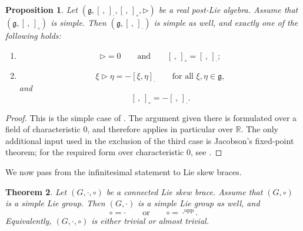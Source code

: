 \documentclass[reqno]{amsart}
\newtheorem{theorem}{Theorem}[section]
\newtheorem{proposition}[theorem]{Proposition}
\newcommand{\R}{\mathbb R}
\newcommand{\g}{\mathfrak{g}}
\begin{document}
\begin{proposition}\label{prop:PLA-simple-rigidity}
Let
$(\g,[\, ,\,]_{\cdot},[\, ,\,]_{\circ},\triangleright)$
be a real post-Lie algebra. Assume that
$(\g,[\, ,\,]_{\circ})$
is simple. Then
$(\g,[\, ,\,]_{\cdot})$
is simple as well, and exactly one of the following holds:
\begin{enumerate}[label=\textup{(\roman*)},leftmargin=2.4em]
    \item
    \[
    \triangleright=0
    \qquad\text{and}\qquad
    [\, ,\,]_{\circ}=[\, ,\,]_{\cdot};
    \]
    \item
    \[
    \xi\triangleright \eta=-[\xi,\eta]_{\cdot}
    \qquad\text{for all }\xi,\eta\in\g,
    \]
    and
    \[
    [\, ,\,]_{\circ}=-[\, ,\,]_{\cdot}.
    \]
\end{enumerate}
\end{proposition}

\begin{proof}
This is the simple case of \cite[Proposition~4.6]{Burde2012affineaction}. The
argument given there is formulated over a field of characteristic \(0\), and
therefore applies in particular over \(\R\). The only additional input used in
the exclusion of the third case is Jacobson's fixed-point theorem; for the
required form over characteristic \(0\), see \cite[\S 5, Theorem~9]{Jac62}.
\end{proof}

We now pass from the infinitesimal statement to Lie skew braces.

\begin{theorem}\label{thm:simple-group-rigidity}
Let $(G,\cdot,\circ)$ be a connected Lie skew brace. Assume that
$(G,\circ)$ is a simple Lie group. Then $(G,\cdot)$ is a simple Lie group as
well, and
\[
\circ=\cdot
\qquad\text{or}\qquad
\circ=\cdot^{\mathrm{opp}}.
\]
Equivalently, $(G,\cdot,\circ)$ is either trivial or almost trivial.
\end{theorem}
\end{document}
